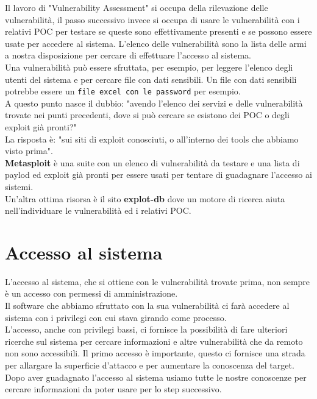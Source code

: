 \documentclass[a4paper,12pt]{article}
\begin{document}
Il lavoro di "Vulnerability Assessment" si occupa della rilevazione delle vulnerabilità, il passo successivo invece si occupa di usare le vulnerabilità con i relativi POC per testare se queste sono effettivamente presenti e se possono essere usate per accedere al sistema. L'elenco delle vulnerabilità sono la lista delle armi a nostra disposizione per cercare di effettuare l'accesso al sistema.\\ 
Una vulnerabilità può essere sfruttata, per esempio, per leggere l'elenco degli utenti del sistema e per cercare file con dati sensibili. Un file con dati sensibili potrebbe essere un \texttt{file excel con le password} per esempio. \\ 
A questo punto nasce il dubbio: "avendo l'elenco dei servizi e delle vulnerabilità trovate nei punti precedenti, dove si può cercare se esistono dei POC o degli exploit già pronti?" \\
La risposta è: "sui siti di exploit conosciuti, o all'interno dei tools che abbiamo visto prima". \\\textbf{ Metasploit}\cite{metasploit} è una suite con un elenco di vulnerabilità da testare e una lista di  paylod ed exploit già pronti per essere usati per tentare di guadagnare l'accesso ai sistemi. \\
Un'altra ottima risorsa è il sito\textbf{ explot-db}\cite{explot-db} dove un motore di ricerca aiuta nell'individuare le vulnerabilità ed i relativi POC.

\section{ Accesso al sistema }

L'accesso al sistema, che si ottiene con le vulnerabilità trovate prima, non sempre è un accesso con permessi di amministrazione.\\
Il software che abbiamo sfruttato con la sua vulnerabilità ci farà accedere al sistema con i privilegi con cui stava girando come processo.\\
L'accesso, anche con privilegi bassi, ci fornisce la possibilità di fare ulteriori ricerche sul sistema per cercare informazioni e altre vulnerabilità che da remoto non sono accessibili.
Il primo accesso è importante, questo ci fornisce una strada per allargare la superficie d'attacco e per aumentare la conoscenza del target.
Dopo aver guadagnato l'accesso al sistema usiamo tutte le nostre conoscenze per cercare informazioni da poter usare per lo step successivo.
\end{document}
